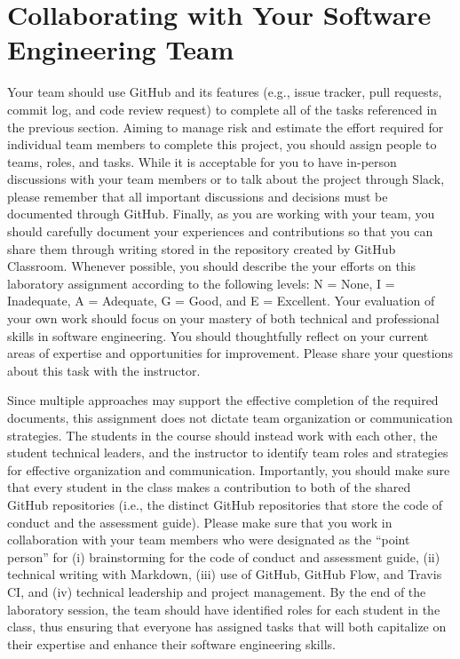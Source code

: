 \documentclass[11pt]{article}
\begin{document}
\section*{Collaborating with Your Software Engineering Team}

Your team should use GitHub and its features (e.g., issue tracker, pull
requests, commit log, and code review request) to complete all of the tasks
referenced in the previous section.
%
Aiming to manage risk and estimate the effort required for individual team
members to complete this project, you should assign people to teams, roles, and
tasks. While it is acceptable for you to have in-person discussions with your
team members or to talk about the project through Slack, please remember that
all important discussions and decisions must be documented through GitHub.
Finally, as you are working with your team, you should carefully document your
experiences and contributions so that you can share them through writing stored
in the repository created by GitHub Classroom.
%
Whenever possible, you should describe the your efforts on this laboratory
assignment according to the following levels: N = None, I = Inadequate, A =
Adequate, G = Good, and E = Excellent. Your evaluation of your own work should
focus on your mastery of both technical and professional skills in software
engineering. You should thoughtfully reflect on your current areas of expertise
and opportunities for improvement. Please share your questions about this task
with the instructor.

Since multiple approaches may support the effective completion of the required
documents, this assignment does not dictate team organization or communication
strategies. The students in the course should instead work with each other, the
student technical leaders, and the instructor to identify team roles and
strategies for effective organization and communication. Importantly, you
should make sure that every student in the class makes a contribution to both
of the shared GitHub repositories (i.e., the distinct GitHub repositories that
store the code of conduct and the assessment guide).
%
Please make sure that you work in collaboration with your team members who were
designated as the ``point person'' for (i) brainstorming for the code of
conduct and assessment guide, (ii) technical writing with Markdown, (iii) use
of GitHub, GitHub Flow, and Travis CI, and (iv) technical leadership and
project management.
%
By the end of the laboratory session, the team should have identified roles for
each student in the class, thus ensuring that everyone has assigned tasks that
will both capitalize on their expertise and enhance their software engineering
skills.
\end{document}
